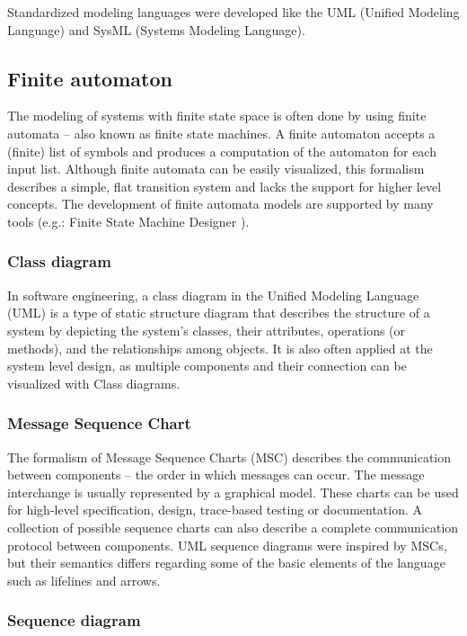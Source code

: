 Standardized modeling languages were developed like the UML (Unified Modeling Language\citep{uml}) and SysML (Systems Modeling Language\citep{sysml1}\citep{sysml2}).


\subsection{Finite automaton }

The modeling of systems with finite state space is often done by using finite automata -- also known as finite state machines. A finite automaton accepts a (finite) list of symbols and produces a computation of the automaton for each input list.
Although finite automata can be easily visualized, this formalism describes a simple, flat transition system and lacks the support for higher level concepts. The development of finite automata models are supported by many tools (e.g.: Finite State Machine Designer \citep{fsmd}).

\subsubsection{Class diagram}

In software engineering, a class diagram in the Unified Modeling Language (UML) is a type of static structure diagram that describes the structure of a system by depicting the system's classes, their attributes, operations (or methods), and the relationships among objects. It is also often applied at the system level design, as multiple components and their connection can be visualized with Class diagrams.

\subsubsection{Message Sequence Chart}

The formalism of Message Sequence Charts (MSC) describes the communication between components -- the order in which messages can occur\citep{msc}\citep{msc2}\citep{Klose2003}. The message interchange is usually represented by a graphical model. These charts can be used for high-level specification, design, trace-based testing or documentation. A collection of possible sequence charts can also describe a complete communication protocol between components. UML sequence diagrams were inspired by MSCs, but their semantics differs regarding some of the basic elements of the language such as lifelines and arrows\citep{mscuml}.

\subsubsection{Sequence diagram}

